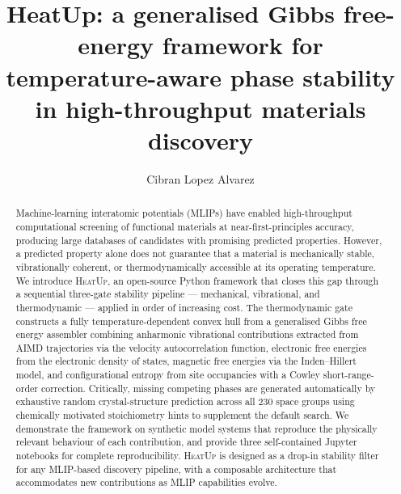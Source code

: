 \documentclass[twocolumn,10pt]{article}
\newcommand{\tp}{\textsc{HeatUp}}
\begin{document}

\title{\textbf{HeatUp}: a generalised Gibbs free-energy framework for\\
  temperature-aware phase stability in high-throughput materials discovery}

\author[1,*]{Cibran Lopez Alvarez}

\date{}
\maketitle
\thispagestyle{fancy}

\begin{abstract}
Machine-learning interatomic potentials (MLIPs) have enabled high-throughput
computational screening of functional materials at near-first-principles accuracy,
producing large databases of candidates with promising predicted properties.
However, a predicted property alone does not guarantee that a material is
mechanically stable, vibrationally coherent, or thermodynamically accessible
at its operating temperature.
We introduce \tp{}, an open-source Python framework that closes this gap through a
sequential three-gate stability pipeline --- mechanical, vibrational, and thermodynamic
--- applied in order of increasing cost.
The thermodynamic gate constructs a fully temperature-dependent convex hull from a
generalised Gibbs free energy assembler combining anharmonic vibrational contributions
extracted from AIMD trajectories via the velocity autocorrelation function, electronic
free energies from the electronic density of states, magnetic free energies via the
Inden--Hillert model, and configurational entropy from site occupancies with a
Cowley short-range-order correction.
Critically, missing competing phases are generated automatically by exhaustive random
crystal-structure prediction across all 230 space groups using chemically motivated
stoichiometry hints to supplement the default search.
We demonstrate the framework on synthetic model systems that reproduce the physically
relevant behaviour of each contribution, and provide three self-contained Jupyter
notebooks for complete reproducibility.
\tp{} is designed as a drop-in stability filter for any MLIP-based discovery pipeline,
with a composable architecture that accommodates new contributions as MLIP capabilities evolve.
\end{abstract}
\end{document}
